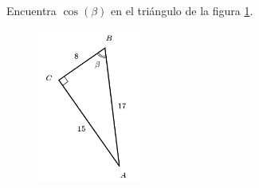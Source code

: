 Encuentra $\cos(\beta)$ en el triángulo de la figura \ref{fig:functrig02}.
\begin{figure}[H]
    \begin{center}
        \includegraphics[width=0.3\textwidth]{../images/functrig02.png}
    \end{center}
    \caption{}
    \label{fig:functrig02}
\end{figure}
